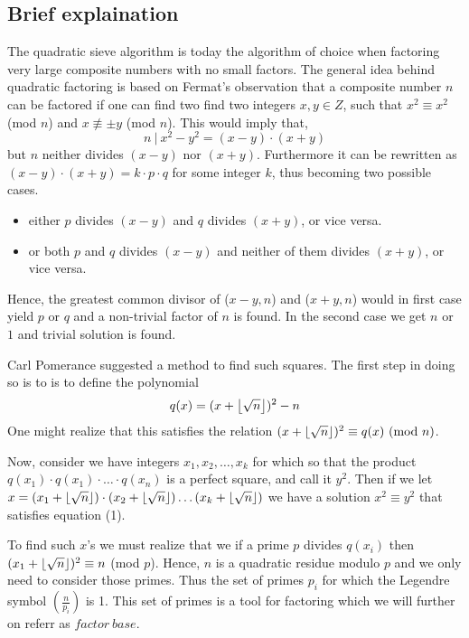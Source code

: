 \subsection{Brief explaination}
The quadratic sieve algorithm is today the algorithm of choice when factoring very large composite numbers
with no small factors. The general idea behind quadratic factoring is based on Fermat's observation that
a composite number $n$ can be factored if one can find two find two integers $x,y \in Z$, such
that $x^2 \equiv x^2$ (mod $n$) and $x \not\equiv \pm y$ (mod $n$). This would imply that,
\begin{equation}
n \ | \ x^2-y^2 = (x-y) \cdot (x+y)
\end{equation}
but $n$ neither divides $(x-y)$ nor $(x+y)$. 
Furthermore it can be rewritten as $(x-y) \cdot (x+y) = k \cdot p \cdot q$ for some integer $k$, thus becoming two possible cases.

\begin{itemize}
	\item either $p$ divides $(x-y)$ and $q$ divides $(x+y)$, or vice versa.
	\item or both $p$ and $q$ divides $(x-y)$ and neither of them divides $(x+y)$, or vice versa.
\end{itemize}

Hence, the greatest common divisor of ($x-y,n$) and ($x+y,n$) would in first case yield $p$ or $q$ and a non-trivial factor of 
$n$ is found. In the second case we get $n$ or $1$ and trivial solution is found. 

Carl Pomerance suggested a method to find such squares\cite{Pomerance1985}. The first step in doing so is to is to define the polynomial 
\begin{equation}
q(x) = (x + \left \lfloor \sqrt{n} \right \rfloor)^2-n 
\end{equation}
One might realize that this satisfies the relation $(x + \myfloor{\sqrt{n}})^2 \equiv q(x) \ (\textrm{mod} \ n)$.

Now, consider we have integers $x_1, x_2, \ldots, x_k$ for which so that the product $q(x_1) \cdot q(x_1) \cdot \ldots \cdot q(x_n)$
is a perfect square, and call it $y^2$. Then if we let $x = (x_1 + \left \lfloor \sqrt{n} \right \rfloor)\cdot(x_2 + \left \lfloor \sqrt{n} \right \rfloor)\ldots(x_k + \left \lfloor \sqrt{n} \right \rfloor)$
we have a solution $x^2 \equiv y^2$ that satisfies equation (1).

To find such $x$'s we must realize that we if a prime $p$ divides $q(x_i)$ then $(x_1 + \left \lfloor \sqrt{n} \right \rfloor)^2 \equiv n$ (mod $p$).
Hence, $n$ is a quadratic residue modulo $p$ and we only need to consider those primes. Thus the set of primes $p_i$ for which the Legendre symbol $(\frac{n}{p_i})$ is 1. This set of primes is a tool for factoring which we will further on referr as $factor \ base$.

